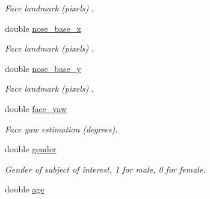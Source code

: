 \begin{DoxyCompactItemize}
\begin{DoxyCompactList}\small\item\em Face landmark (pixels). \end{DoxyCompactList}\item 
\hypertarget{structjanice__attributes_a5fcf5e4cc1b7ff175ca9dd067b845f7c}{}double \hyperlink{structjanice__attributes_a5fcf5e4cc1b7ff175ca9dd067b845f7c}{nose\+\_\+base\+\_\+x}\label{structjanice__attributes_a5fcf5e4cc1b7ff175ca9dd067b845f7c}

\begin{DoxyCompactList}\small\item\em Face landmark (pixels). \end{DoxyCompactList}\item 
\hypertarget{structjanice__attributes_afe1b9645e0d65b7a599931b3a887dce3}{}double \hyperlink{structjanice__attributes_afe1b9645e0d65b7a599931b3a887dce3}{nose\+\_\+base\+\_\+y}\label{structjanice__attributes_afe1b9645e0d65b7a599931b3a887dce3}

\begin{DoxyCompactList}\small\item\em Face landmark (pixels). \end{DoxyCompactList}\item 
\hypertarget{structjanice__attributes_a4a06eaa23cff3c4884b61e631e4e2447}{}double \hyperlink{structjanice__attributes_a4a06eaa23cff3c4884b61e631e4e2447}{face\+\_\+yaw}\label{structjanice__attributes_a4a06eaa23cff3c4884b61e631e4e2447}

\begin{DoxyCompactList}\small\item\em Face yaw estimation (degrees). \end{DoxyCompactList}\item 
\hypertarget{structjanice__attributes_aa4c911767f694333426f3d468b1303d6}{}double \hyperlink{structjanice__attributes_aa4c911767f694333426f3d468b1303d6}{gender}\label{structjanice__attributes_aa4c911767f694333426f3d468b1303d6}

\begin{DoxyCompactList}\small\item\em Gender of subject of interest, 1 for male, 0 for female. \end{DoxyCompactList}\item 
\hypertarget{structjanice__attributes_a2cc35e8902221f9d0dfc329155d5ce8e}{}double \hyperlink{structjanice__attributes_a2cc35e8902221f9d0dfc329155d5ce8e}{age}\label{structjanice__attributes_a2cc35e8902221f9d0dfc329155d5ce8e}


\end{DoxyCompactItemize}
